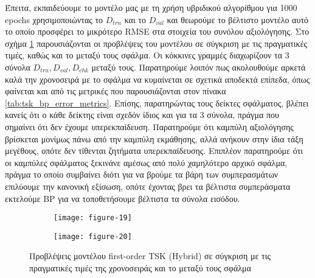 \documentclass[11pt,a4paper,titlepage, oneside]{article}
\newlength\figureheight
\newlength\figurewidth
\begin{document}
			 Έπειτα, εκπαιδεύουμε το μοντέλο μας με τη χρήση υβριδικού αλγορίθμου για 1000 epochs χρησιμοποιώντας το $D_{trn}$ και το $D_{val}$ και θεωρούμε το βέλτιστο μοντέλο αυτό το οποίο προσφέρει το μικρότερο RMSE στα στοιχεία του συνόλου αξιολόγησης. Στο σχήμα \ref{fig:tsk_hybrid_predictions} παρουσιάζονται οι προβλέψεις του μοντέλου σε σύγκριση με τις πραγματικές τιμές, καθώς και το μεταξύ τους σφάλμα. Οι κόκκινες γραμμές διαχωρίζουν τα 3 σύνολα $D_{trn}, D_{val}, D_{chk}$ μεταξύ τους. Παρατηρούμε λοιπόν πως ακολουθούμε αρκετά καλά την χρονοσειρά με το σφάλμα να κυμαίνεται σε σχετικά αποδεκτά επίπεδα, όπως φαίνεται και από τις μετρικές που παρουσιάζονται στον πίνακα \ref{tab:tsk_bp_error_metrics}. Επίσης, παρατηρώντας τους δείκτες σφάλματος, βλέπει κανείς ότι ο κάθε δείκτης είναι σχεδόν ίδιος και για τα 3 σύνολα, πράγμα που σημαίνει ότι δεν έχουμε υπερεκπαίδευση. Παρατηρούμε ότι καμπύλη αξιολόγησης βρίσκεται μονίμως πάνω από την καμπύλη εκμάθησης, αλλά ανήκουν στην ίδια τάξη μεγέθους, οπότε δεν τίθενται ζητήματα υπερεκπαίδευσης. Επιπλέον παρατηρούμε ότι οι καμπύλες σφάλματος ξεκινάνε αμέσως από πολύ χαμηλότερο αρχικό σφάλμα, πράγμα το οποίο συμβαίνει διότι για να βρούμε τα βάρη των συμπερασμάτων επιλύουμε την κανονική εξίσωση, οπότε έχοντας βρει τα βέλτιστα συμπεράσματα εκτελούμε BP για να τοποθετήσουμε βέλτιστα τα σύνολα εισόδου. \\
						
			\begin{figure}[]
			 	\setlength{}
				\setlength{}	
				\centering
				\begin{subfigure}[b]{0.49\textwidth}
					\texttt{[image: figure-19]}
				\end{subfigure}
				\begin{subfigure}[b]{0.49\textwidth}
					\texttt{[image: figure-20]}
				\end{subfigure}
				\caption{Προβλέψεις μοντέλου first-order TSK (Hybrid) σε σύγκριση με τις πραγματικές τιμές της χρονοσειράς και το μεταξύ τους σφάλμα}
				\label{fig:tsk_hybrid_predictions}
			\end{figure}
			
\end{document}
